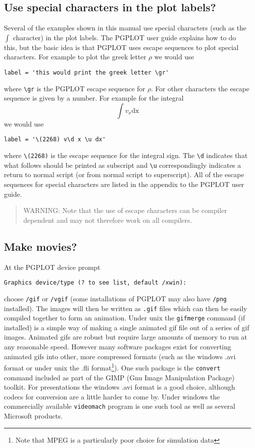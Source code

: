 \documentclass[a4paper,12pt]{article}
\begin{document}
\subsection{Use special characters in the plot labels?}
 Several of the examples shown in this manual use special characters (such as
the $\int$ character) in the plot labels. The PGPLOT user guide explains how to do
this, but the basic idea is that PGPLOT uses escape sequences to plot special
characters. For example to plot the greek letter $\rho$ we would use
\begin{verbatim}
label = 'this would print the greek letter \gr'
\end{verbatim}
where \verb+\gr+ is the PGPLOT escape sequence for $\rho$. For other
characters the escape sequence is given by a number. For example for the integral 
\begin{equation}
\int v_x \mathrm{dx}
\end{equation}
we would use
\begin{verbatim}
label = '\(2268) v\d x \u dx'
\end{verbatim}
where \verb+\(2268)+ is the escape sequence for the integral sign. The
\verb+\d+ indicates that what follows should be printed as subscript and
\verb+\u+ correspondingly indicates a return to normal script (or from normal script to
superscript). All of the escape sequences for special characters are listed in
the appendix to the PGPLOT user guide.
\begin{quote}
 WARNING: Note that the use of escape characters can be compiler dependent and
 may not therefore work on all compilers.
\end{quote}

\subsection{Make movies?}
 At the PGPLOT device prompt
\begin{verbatim}
Graphics device/type (? to see list, default /xwin):
\end{verbatim}
choose \verb+/gif+ or \verb+/vgif+ (some installations of PGPLOT may also have \verb+/png+
installed). The images will then be written as \verb+.gif+ files which can then be easily compiled
together to form an animation. Under unix the \verb+gifmerge+ command (if installed) is a simple way
of making a single animated gif file out of a series of gif images. Animated gifs are robust but
require large amounts of memory to run at any reasonable speed. However many software packages exist
for converting animated gifs into other, more compressed formats (such as the windows .avi format or
under unix the .fli format\footnote{Note that MPEG is a particularly poor choice for simulation data}). One such package is the
\verb+convert+ command included as part of the GIMP (Gnu Image Manipulation Package) toolkit.
For presentations the windows .avi format is a good choice, although codecs for conversion are a
little harder to come by. Under windows the commercially available \verb+videomach+ program is one
such tool as well as several Microsoft products.
\end{document}
